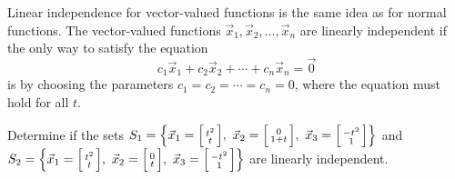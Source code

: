 \documentclass{ximera}
\begin{document}
Linear independence for vector-valued functions is the same idea as for normal functions. The vector-valued functions $\vec{x}_1,\vec{x}_2,\ldots,\vec{x}_n$ are linearly independent  if the only way to satisfy the equation
\begin{equation*}
    c_1 \vec{x}_1 + c_2 \vec{x}_2 + \cdots + c_n \vec{x}_n  = \vec{0}
\end{equation*}
is by choosing the parameters $c_1 = c_2 = \cdots = c_n = 0$, where the equation must hold for all $t$.

\begin{example} 
    Determine if the sets $S_1 = \Bigl\{ \vec{x}_1 = \Bigl[ \begin{smallmatrix} t^2 \\ t \end{smallmatrix} \Bigr],\ \vec{x}_2 = \Bigl[ \begin{smallmatrix} 0 \\ 1+t \end{smallmatrix} \Bigr],\ \vec{x}_3 = \Bigl[ \begin{smallmatrix} -t^2 \\ 1 \end{smallmatrix} \Bigr] \Bigr\}$ and $S_2 = \Bigl\{ \vec{x}_1 = \Bigl[ \begin{smallmatrix} t^2 \\ t \end{smallmatrix} \Bigr],\ \vec{x}_2 = \Bigl[ \begin{smallmatrix} 0 \\ t \end{smallmatrix} \Bigr],\ \vec{x}_3 = \Bigl[ \begin{smallmatrix} -t^2 \\ 1 \end{smallmatrix} \Bigr]\Bigr\}$ are linearly independent.
\end{example}
\end{document}
